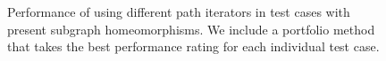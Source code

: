 \begin{figure}
\begin{subfigure} {0.5\linewidth}

\end{subfigure}

\caption{Performance of using different path iterators in test cases with present subgraph homeomorphisms. We include a portfolio method that takes the best performance rating for each individual test case.}	
\label{fig:test}
\end{figure}





